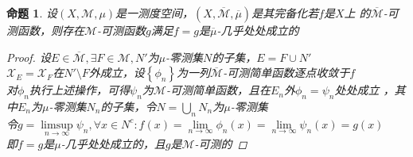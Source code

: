 \documentclass[12pt, a4paper, oneside]{ctexbook}
\newtheorem{proposition}[theorem]{命题}
\begin{document}
\begin{proposition}
    设$(X,\mathcal{M},\mu)$是一测度空间，$(X,\overline{\mathcal{M}},\overline{\mu})$是其完备化若$f$是$X$上
    的$\overline{\mathcal{M}}$-可测函数，则存在$\mathcal{M}$-可测函数$g$满足$f=g$是$\overline{\mu}$-几乎处处成立的
    \begin{proof}
        设$E\in\overline{\mathcal{M}},\exists F\in\mathcal{M},N'$为$\mu$-零测集$N$的子集，$E=F\cup N'$\\
        $\mathcal{X}_E=\mathcal{X}_F$在$N'\setminus F$外成立，设$\left\{\phi_n\right\}$为一列$\overline{\mathcal{M}}$-可测简单函数逐点收敛于$f$\\
        对$\phi_n$执行上述操作，可得$\psi_n$为$\mathcal{M}$-可测简单函数，且在$E_n$外$\phi_n=\psi_n$处处成立
        ，其中$E_n$为$\mu$-零测集$N_n$的子集，令$N=\bigcup_n N_n$为$\mu$-零测集\\
        令$g=\underset{n\to \infty}{\limsup}\psi_n,\forall x\in N^c:f(x)=\underset{n\to\infty}{\lim}\phi_n(x)=\underset{n\to\infty}{\lim}\psi_n(x)=g(x)$\\
        即$f=g$是$\mu$-几乎处处成立的，且$g$是$\mathcal{M}$-可测的
    \end{proof}
\end{proposition}
\end{document}
